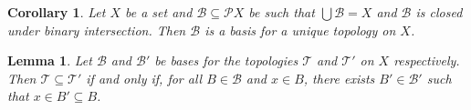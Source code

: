 \documentclass{report}
\newtheorem{lm}{Lemma}[section]
\newtheorem{cor}{Corollary}[lm]
\theoremstyle{definition}
\begin{document}
  \begin{cor}
    \label{cor:topology:basis:generate}
    Let $X$ be a set and $\mathcal{B} \subseteq \mathcal{P} X$ be such that
    $\bigcup \mathcal{B} = X$ and $\mathcal{B}$ is closed under binary
    intersection. Then $\mathcal{B}$ is a basis for a unique topology on $X$.
  \end{cor}

  \begin{lm}
    \label{lm:topology:basis:finer}
    Let $\mathcal{B}$ and $\mathcal{B}'$ be bases for the topologies
    $\mathcal{T}$ and $\mathcal{T}'$ on $X$ respectively. Then $\mathcal{T}
    \subseteq \mathcal{T}'$ if and only if, for all $B \in \mathcal{B}$ and $x
    \in B$, there exists $B' \in \mathcal{B}'$ such that $x \in B' \subseteq B$.
  \end{lm}
\end{document}
